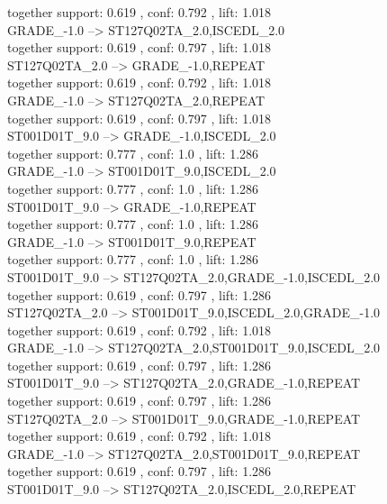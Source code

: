 \documentclass[12pt, a4paper, oneside]{ctexart}
\begin{document}
  together support: 0.619 , conf: 0.792 , lift: 1.018\\
GRADE\_-1.0 --> ST127Q02TA\_2.0,ISCEDL\_2.0 \\
  together support: 0.619 , conf: 0.797 , lift: 1.018\\
ST127Q02TA\_2.0 --> GRADE\_-1.0,REPEAT \\
  together support: 0.619 , conf: 0.792 , lift: 1.018\\
GRADE\_-1.0 --> ST127Q02TA\_2.0,REPEAT \\
  together support: 0.619 , conf: 0.797 , lift: 1.018\\
ST001D01T\_9.0 --> GRADE\_-1.0,ISCEDL\_2.0 \\
  together support: 0.777 , conf: 1.0 , lift: 1.286\\
GRADE\_-1.0 --> ST001D01T\_9.0,ISCEDL\_2.0 \\
  together support: 0.777 , conf: 1.0 , lift: 1.286\\
ST001D01T\_9.0 --> GRADE\_-1.0,REPEAT \\
  together support: 0.777 , conf: 1.0 , lift: 1.286\\
GRADE\_-1.0 --> ST001D01T\_9.0,REPEAT \\
  together support: 0.777 , conf: 1.0 , lift: 1.286\\
ST001D01T\_9.0 --> ST127Q02TA\_2.0,GRADE\_-1.0,ISCEDL\_2.0 \\
 together support: 0.619 , conf: 0.797 , lift: 1.286\\
ST127Q02TA\_2.0 --> ST001D01T\_9.0,ISCEDL\_2.0,GRADE\_-1.0\\ 
  together support: 0.619 , conf: 0.792 , lift: 1.018\\
GRADE\_-1.0 --> ST127Q02TA\_2.0,ST001D01T\_9.0,ISCEDL\_2.0 \\
 together support: 0.619 , conf: 0.797 , lift: 1.286\\
ST001D01T\_9.0 --> ST127Q02TA\_2.0,GRADE\_-1.0,REPEAT \\
 together support: 0.619 , conf: 0.797 , lift: 1.286\\
ST127Q02TA\_2.0 --> ST001D01T\_9.0,GRADE\_-1.0,REPEAT \\
  together support: 0.619 , conf: 0.792 , lift: 1.018\\
GRADE\_-1.0 --> ST127Q02TA\_2.0,ST001D01T\_9.0,REPEAT \\
 together support: 0.619 , conf: 0.797 , lift: 1.286\\
ST001D01T\_9.0 --> ST127Q02TA\_2.0,ISCEDL\_2.0,REPEAT \\
\end{document}
